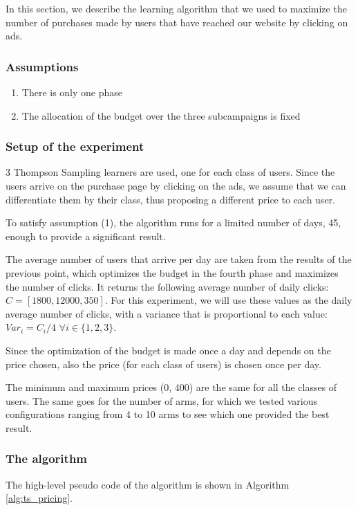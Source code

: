\newcommand{\pluseq}{\mathrel{+}=}

In this section, we describe the learning algorithm that we used to maximize the number of purchases made by users that have reached our website by clicking on ads.

\subsubsection{Assumptions}
\begin{enumerate}
    \item There is only one phase
    \item The allocation of the budget over the three subcampaigns is fixed
\end{enumerate}

\subsubsection{Setup of the experiment}
3 Thompson Sampling learners are used, one for each class of users. Since the users arrive on the purchase page by clicking on the ads, we assume that we can differentiate them by their class, thus proposing a different price to each user.

To satisfy assumption (1), the algorithm runs for a limited number of days, 45, enough to provide a significant result.

The average number of users that arrive per day are taken from the results of the previous point, which optimizes the budget in the fourth phase and maximizes the number of clicks. It returns the following average number of daily clicks: $C=[1800, 12000, 350]$. For this experiment, we will use these values as the daily average number of clicks, with a variance that is proportional to each value: $Var_i = C_i / 4$ $\forall{i} \in \{1,2,3\}$.

Since the optimization of the budget is made once a day and depends on the price chosen, also the price (for each class of users) is chosen once per day.

The minimum and maximum prices (0, 400) are the same for all the classes of users. The same goes for the number of arms, for which we tested various configurations ranging from 4 to 10 arms to see which one provided the best result.

\subsubsection{The algorithm}
The high-level pseudo code of the algorithm is shown in Algorithm \ref{alg:ts_pricing}.

